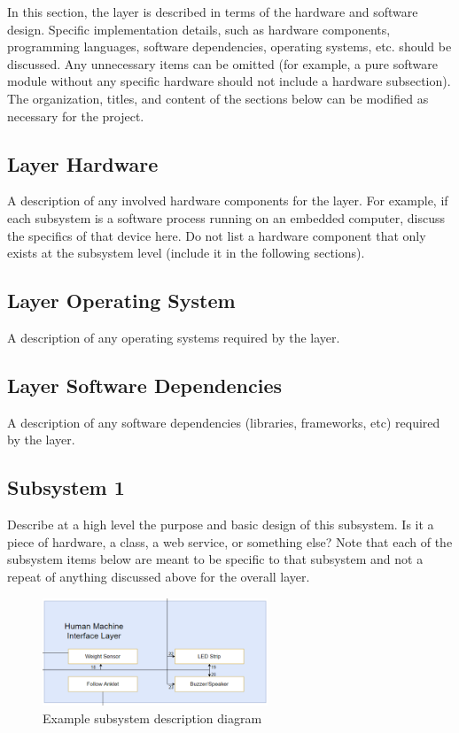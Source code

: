 In this section, the layer is described in terms of the hardware and software design. Specific implementation details, such as hardware components, programming languages, software dependencies, operating systems, etc. should be discussed. Any unnecessary items can be omitted (for example, a pure software module without any specific hardware should not include a hardware subsection). The organization, titles, and content of the sections below can be modified as necessary for the project.

\subsection{Layer Hardware}
A description of any involved hardware components for the layer. For example, if each subsystem is a software process running on an embedded computer, discuss the specifics of that device here. Do not list a hardware component that only exists at the subsystem level (include it in the following sections).

\subsection{Layer Operating System}
A description of any operating systems required by the layer.

\subsection{Layer Software Dependencies}
A description of any software dependencies (libraries, frameworks, etc) required by the layer.

\subsection{Subsystem 1}
Describe at a high level the purpose and basic design of this subsystem. Is it a piece of hardware, a class, a web service, or something else? Note that each of the subsystem items below are meant to be specific to that subsystem and not a repeat of anything discussed above for the overall layer.

\begin{figure}[h!]
	\centering
 	\includegraphics[width=0.60\textwidth]{images/HMI.png} %
 \caption{Example subsystem description diagram} %
\end{figure}

